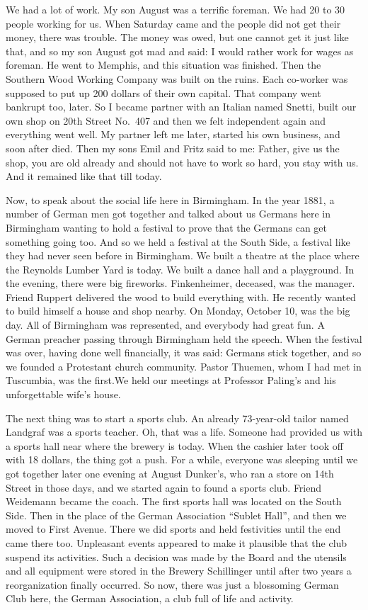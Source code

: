We had a lot of work. My son August was a terrific foreman. We had 20 to 30 people working for us. When Saturday came and the people did not get their money, there was trouble. The money was owed, but one cannot get it just like that, and so my son August got mad and said: I would rather work for wages as foreman. He went to Memphis, and this situation was finished. Then the Southern Wood Working Company was built on the ruins. Each co-worker was supposed to put up 200 dollars of their own capital. That company went bankrupt too, later. So I became partner with an Italian named Snetti, built our own shop on 20th Street No.~407 and then we felt independent again and everything went well. My partner left me later, started his own business, and soon after died. Then my sons Emil and Fritz said to me: Father, give us the shop, you are old already and should not have to work so hard, you stay with us. And it remained like that till today.

Now, to speak about the social life here in Birmingham. In the year 1881, a number of German men got together and talked about us Germans here in Birmingham wanting to hold a festival to prove that the Germans can get something going too. And so we held a festival at the South Side, a festival like they had never seen before in Birmingham. We built a theatre at the place where the Reynolds Lumber Yard is today. We built a dance hall and a playground. In the evening, there were big fireworks. Finkenheimer, deceased, was the manager. Friend Ruppert delivered the wood to build everything with. He recently wanted to build himself a house and shop nearby. On Monday, October 10, was the big day. All of Birmingham was represented, and everybody had great fun. A German preacher passing through Birmingham held the speech. When the festival was over, having done well financially, it was said: Germans stick together, and so we founded a Protestant church community. Pastor Thuemen, whom I had met in Tuscumbia, was the first.We held our meetings at Professor Paling's and his unforgettable wife's house.

The next thing was to start a sports club. An already 73-year-old tailor named Landgraf was a sports teacher. Oh, that was a life. Someone had provided us with a sports hall near where the brewery is today. When the cashier later took off with 18 dollars, the thing got a push. For a while, everyone was sleeping until we got together later one evening at August Dunker's, who ran a store on 14th Street in those days, and we started again to found a sports club. Friend Weidemann became the coach. The first sports hall was located on the South Side. Then in the place of the German Association ``Sublet Hall'', and then we moved to First Avenue. There we did sports and held festivities until the end came there too. Unpleasant events appeared to make it plausible that the club suspend its activities. Such a decision was made by the Board and the utensils and all equipment were stored in the Brewery Schillinger until after two years a reorganization finally occurred. So now, there was just a blossoming German Club here, the German Association, a club full of life and activity.

